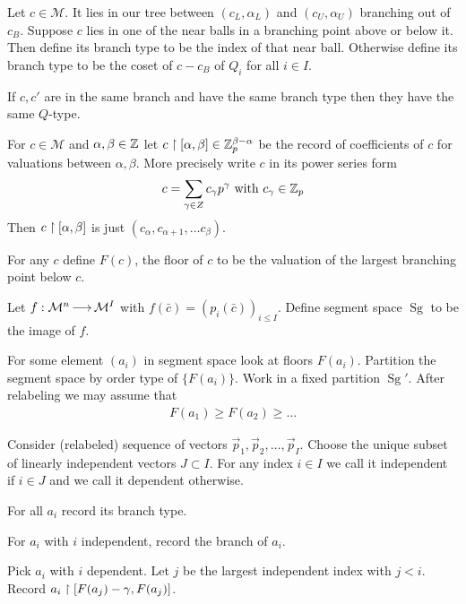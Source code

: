 \documentclass{amsart}
\newcommand{\M}{\mathcal M}
\DeclareMathOperator{\Sg}{Sg}
\begin{document}
\begin{Definition}
	Let $c \in \M$.
	It lies in our tree between $(c_L, \alpha_L)$ and $(c_U, \alpha_U)$ branching out of $c_B$.
	Suppose $c$ lies in one of the near balls in a branching point above or below it.
	Then define its branch type to be the index of that near ball.
	Otherwise define its branch type to be the coset of $c - c_B$ of $Q_i$ for all $i \in I$.
\end{Definition}

\begin{Lemma}
	If $c, c'$ are in the same branch and have the same branch type then they have the same $Q$-type.
\end{Lemma}

\begin{Definition}
	For $c \in \M$ and $\alpha, \beta \in \mathbb{Z}$ let $c \upharpoonright [\alpha, \beta] \in \mathbb{Z}_p^{\beta - \alpha}$ be the record of coefficients of $c$ for valuations between $\alpha, \beta$. More precisely write $c$ in its power series form
	\begin{align*}
		c = \sum_{\gamma \in Z} c_\gamma p^\gamma \text{ with } c_\gamma \in \mathbb{Z}_p
	\end{align*}
	Then $c \upharpoonright [\alpha, \beta]$ is just $(c_\alpha, c_{\alpha+1}, \ldots c_\beta)$.
\end{Definition}

For any $c$ define $F(c)$, the floor of $c$ to be the valuation of the largest branching point below $c$.

Let $f: \M^n \arr \M^I$ with $f(\bar c) = (p_i(\bar c))_{i \leq I}$.
Define segment space $\Sg$ to be the image of $f$.

For some element $(a_i)$ in segment space look at floors $F(a_i)$.
Partition the segment space by order type of $\{F(a_i)\}$.
Work in a fixed partition $\Sg'$.
After relabeling we may assume that
\begin{align*}
	F(a_1) \geq F(a_2) \geq \ldots 
\end{align*}

Consider (relabeled) sequence of vectors $\vec p_1, \vec p_2, \ldots, \vec p_I$.
Choose the unique subset of linearly independent vectors $J \subset I$.
For any index $i \in I$ we call it independent if $i \in J$ and we call it dependent otherwise.

For all $a_i$ record its branch type.

For $a_i$ with $i$ independent, record the branch of $a_i$.

Pick $a_i$ with $i$ dependent.
Let $j$ be the largest independent index with $j < i$.
Record $a_i \upharpoonright [F(a_j) - \gamma, F(a_j)]$.
\end{document}
